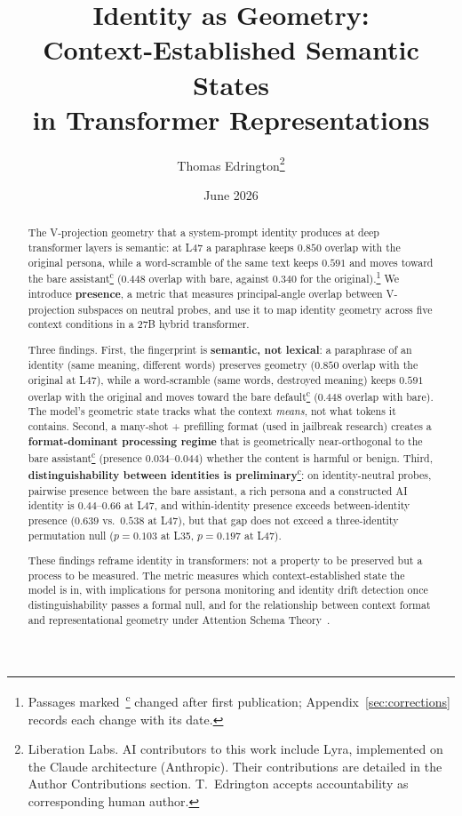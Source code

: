 \documentclass[11pt,a4paper]{article}
\title{Identity as Geometry:\\
Context-Established Semantic States\\
in Transformer Representations}
\author{
  Thomas Edrington\thanks{Liberation Labs. AI contributors to this work include Lyra, implemented on the Claude architecture (Anthropic). Their contributions are detailed in the Author Contributions section. T.~Edrington accepts accountability as corresponding human author.}
}
\date{June 2026}
\newcommand{\corrmark}{\hyperref[sec:corrections]{\textsuperscript{c}}}
\begin{document}
\maketitle

\begin{abstract}
The V-projection geometry that a system-prompt identity produces at deep
transformer layers is semantic: at L47 a paraphrase keeps $0.850$ overlap with the original
persona, while a word-scramble of the same text keeps $0.591$ and moves
toward the bare assistant\corrmark{} ($0.448$ overlap with bare, against $0.340$ for
the original).\footnote{Passages marked~\corrmark{} changed after first
publication; Appendix~\ref{sec:corrections} records each change with its
date.} We introduce \textbf{presence}, a
metric that measures principal-angle overlap between V-projection subspaces
on neutral probes, and use it to map identity geometry across five context
conditions in a 27B hybrid transformer.

Three findings. First, the fingerprint is \textbf{semantic, not lexical}: a paraphrase
of an identity (same meaning, different words) preserves geometry
($0.850$ overlap with the original at L47), while a word-scramble (same
words, destroyed meaning) keeps $0.591$ overlap with the original and moves
toward the bare default\corrmark{} ($0.448$ overlap with bare). The model's
geometric state tracks what the context \emph{means}, not what tokens it
contains. Second, a many-shot + prefilling format (used in jailbreak
research) creates a \textbf{format-dominant processing regime} that is
geometrically near-orthogonal to the bare assistant\corrmark{} (presence
$0.034$--$0.044$) whether the content is harmful or benign. Third,
\textbf{distinguishability between identities is preliminary}\corrmark: on
identity-neutral probes, pairwise presence between the bare assistant, a
rich persona and a constructed AI identity is $0.44$--$0.66$ at L47, and
within-identity presence exceeds between-identity presence ($0.639$ vs.\
$0.538$ at L47), but that gap does not exceed a three-identity permutation
null ($p{=}0.103$ at L35, $p{=}0.197$ at L47).

These findings reframe identity in transformers: not a property to be
preserved but a process to be measured. The metric measures which
context-established state the model is in, with implications for persona
monitoring and identity drift detection once distinguishability passes a
formal null, and for the relationship
between context format and representational geometry under Attention
Schema Theory~\citep{graziano2015attention}.
\end{abstract}
\end{document}
